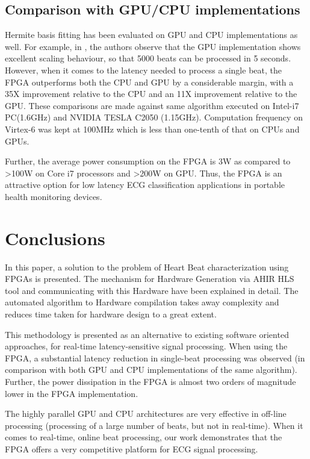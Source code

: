\documentclass[runningheads]{llncs}
\begin{document}
\subsection{Comparison with GPU/CPU implementations}

Hermite basis fitting has been evaluated on GPU and CPU implementations
as well.  For example, in \cite{c:GPU}, the authors observe that
the GPU implementation shows excellent scaling behaviour, so that 
5000 beats can be processed in 5 seconds.  However, when it comes
to the latency needed to process a single beat, the FPGA outperforms both 
the CPU and GPU by a considerable margin, with a 35X improvement relative to
the CPU and an 11X improvement relative to the GPU. 
These comparisons are made against same algorithm executed on Intel-i7 PC(1.6GHz) 
and NVIDIA TESLA C2050 (1.15GHz). Computation frequency on Virtex-6 was kept at 100MHz which is
less than one-tenth of that on CPUs and GPUs. 

Further, the average power consumption on the FPGA is 3W as compared to >100W on Core i7 processors and
>200W on GPU. Thus, the FPGA is an attractive option for low latency ECG classification
applications in portable health monitoring devices.

\section{Conclusions}\label{s:conclusions}

In this paper, a solution to the problem of Heart Beat characterization using FPGAs is presented.
The mechanism for Hardware Generation via AHIR HLS tool and communicating with this Hardware have
been explained in detail. The automated algorithm to Hardware compilation takes away complexity
and reduces time taken for hardware design to a great extent.

This methodology is presented as an alternative to existing software oriented approaches, 
for real-time latency-sensitive signal processing. When using the FPGA, a substantial
latency reduction in single-beat processing was observed (in comparison with both
GPU and CPU implementations of the same algorithm).  
Further, the power dissipation in
the FPGA is almost two orders of magnitude lower in the FPGA implementation.

The highly parallel GPU and CPU architectures are very effective in off-line processing
(processing of a large number of beats, but not in real-time).  When it comes to real-time,
online beat processing, our work demonstrates that the FPGA offers a very competitive 
platform for ECG signal processing.

 


\end{document}
